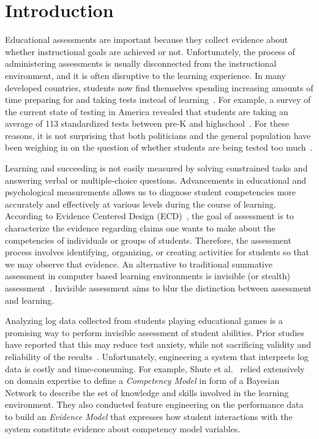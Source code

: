\documentclass{sigchi}
\begin{document}
	
	\section{Introduction}
	Educational assessments are important because they collect evidence about  whether instructional goals are achieved or not.
	Unfortunately, the process of  administering assessments is usually disconnected from the instructional environment, and  it is often  disruptive to the learning experience. 
	In many developed countries, students now find themselves spending increasing amounts of time preparing for and taking tests instead of learning~\cite{hofman2015re}.
	For example, a  survey of the current state of testing in America revealed that students are taking an average of 113 standardized tests between pre-K and highschool~\cite{lazarin2014testing}. 
	For these reasons, it is not surprising that both politicians and the general population have been weighing in on the question of whether students are being tested too much~\cite{lazarin2014testing}.
	
	Learning and succeeding is not easily measured by solving constrained tasks and answering verbal or multiple-choice questions.
	Advancements in educational and psychological measurements allows us to diagnose student competencies more accurately and effectively at various levels during the course of learning.
	According to Evidence Centered Design (ECD)~\cite{mislevy2012design}, the goal of assessment is to characterize the evidence regarding claims one wants to make about the competencies of individuals or groups of students.
	Therefore, the assessment process involves identifying, organizing, or creating activities for students so that we may observe that evidence.
	An alternative to traditional summative assessment in computer based learning environments is invisible (or stealth) assessment~\cite{shute2013stealth}.
	Invisible assessment aims to blur the distinction between assessment and learning.
	
	
	Analyzing log data collected from students playing educational games is a  promising way to perform  invisible assessment of student abilities.
	Prior studies have reported that this may reduce test anxiety, while not sacrificing validity and reliability of the results~\cite{shute2008you}.
	Unfortunately, engineering a system that interprets log data is costly and time-consuming.
	For example, Shute et al.~\cite{shute2013stealth, shute2009melding} relied extensively on domain expertise to define a \textit{Competency Model} in form of a Bayesian Network to describe the set of knowledge and skills involved in the learning environment.
	They also conducted feature engineering on the performance data to build an \textit{Evidence Model} that expresses how student interactions with the system constitute evidence about competency model variables.
	
\end{document}
